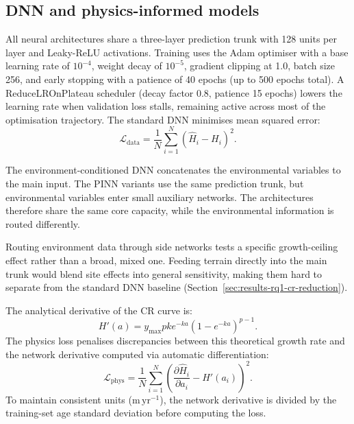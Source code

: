 \documentclass[logo,msc,ai]{infthesis}           %
\begin{document}
\subsection{DNN and physics-informed models}
All neural architectures share a three-layer prediction trunk with 128 units per layer and Leaky-ReLU activations. Training uses the Adam optimiser with a base learning rate of $10^{-4}$, weight decay of $10^{-5}$, gradient clipping at 1.0, batch size 256, and early stopping with a patience of 40 epochs (up to 500 epochs total). A ReduceLROnPlateau scheduler (decay factor 0.8, patience 15 epochs) lowers the learning rate when validation loss stalls, remaining active across most of the optimisation trajectory. The standard DNN minimises mean squared error:
\begin{equation}
\mathcal{L}_{\mathrm{data}}=\frac{1}{N}\sum_{i=1}^{N}
\left(\hat H_i-H_i\right)^2.
\label{eq:data-loss}
\end{equation}

The environment-conditioned DNN concatenates the environmental variables to the main input. The PINN variants use the same prediction trunk, but environmental variables enter small auxiliary networks. The architectures therefore share the same core capacity, while the environmental information is routed differently.

Routing environment data through side networks tests a specific growth-ceiling effect rather than a broad, mixed one. Feeding terrain directly into the main trunk would blend site effects into general sensitivity, making them hard to separate from the standard DNN baseline (Section~\ref{sec:results-rq1-cr-reduction}).

The analytical derivative of the CR curve is:
\begin{equation}
H'(a)=y_{\max}pk e^{-ka}\left(1-e^{-ka}\right)^{p-1}.
\label{eq:cr-derivative}
\end{equation}
The physics loss penalises discrepancies between this theoretical growth rate and the network derivative computed via automatic differentiation:
\begin{equation}
\mathcal{L}_{\mathrm{phys}}=\frac{1}{N}\sum_{i=1}^{N}
\left(\frac{\partial\hat H_i}{\partial a_i}-H'(a_i)\right)^2.
\label{eq:physics-loss}
\end{equation}
To maintain consistent units ($\mathrm{m\,yr^{-1}}$), the network derivative is divided by the training-set age standard deviation before computing the loss.
\end{document}
